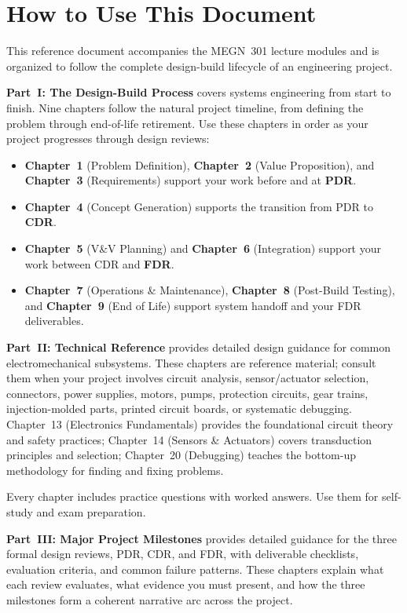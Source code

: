 \chapter*{How to Use This Document}

This reference document accompanies the MEGN~301 lecture modules and is organized to follow the complete design-build lifecycle of an engineering project.

\textbf{Part~I: The Design-Build Process} covers systems engineering from start to finish. Nine chapters follow the natural project timeline, from defining the problem through end-of-life retirement. Use these chapters in order as your project progresses through design reviews:

\begin{itemize}[nosep,leftmargin=1.5em]
\item \textbf{Chapter~1} (Problem Definition), \textbf{Chapter~2} (Value Proposition), and \textbf{Chapter~3} (Requirements) support your work before and at \textbf{PDR}.
\item \textbf{Chapter~4} (Concept Generation) supports the transition from PDR to \textbf{CDR}.
\item \textbf{Chapter~5} (V\&V Planning) and \textbf{Chapter~6} (Integration) support your work between CDR and \textbf{FDR}.
\item \textbf{Chapter~7} (Operations \& Maintenance), \textbf{Chapter~8} (Post-Build Testing), and \textbf{Chapter~9} (End of Life) support system handoff and your FDR deliverables.
\end{itemize}

\textbf{Part~II: Technical Reference} provides detailed design guidance for common electromechanical subsystems. These chapters are reference material; consult them when your project involves circuit analysis, sensor/actuator selection, connectors, power supplies, motors, pumps, protection circuits, gear trains, injection-molded parts, printed circuit boards, or systematic debugging. Chapter~13 (Electronics Fundamentals) provides the foundational circuit theory and safety practices; Chapter~14 (Sensors \& Actuators) covers transduction principles and selection; Chapter~20 (Debugging) teaches the bottom-up methodology for finding and fixing problems.

Every chapter includes practice questions with worked answers. Use them for self-study and exam preparation.

\textbf{Part~III: Major Project Milestones} provides detailed guidance for the three formal design reviews, PDR, CDR, and FDR, with deliverable checklists, evaluation criteria, and common failure patterns. These chapters explain what each review evaluates, what evidence you must present, and how the three milestones form a coherent narrative arc across the project.

